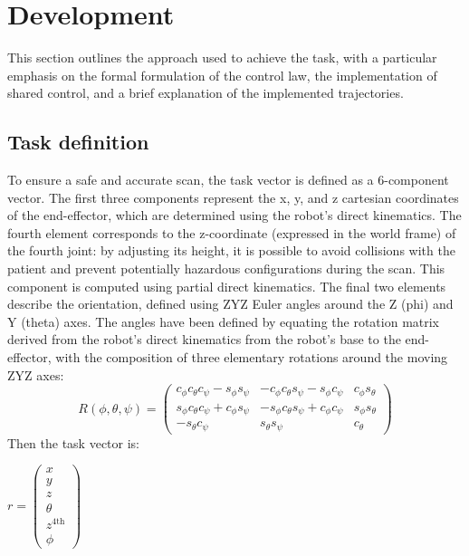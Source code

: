 \documentclass{article}
\begin{document}
\section{Development}
This section outlines the approach used to achieve the task, with a particular emphasis on the formal formulation of the control law, the implementation of shared control, and a brief explanation of the implemented trajectories.

\subsection{Task definition}
To ensure a safe and accurate scan, the task vector is defined as a 6-component vector. The first three components represent the x, y, and z cartesian coordinates of the end-effector, which are determined using the robot's direct kinematics. The fourth element corresponds to the z-coordinate (expressed in the world frame) of the fourth joint: by adjusting its height, it is possible to avoid collisions with the patient and prevent potentially hazardous configurations during the scan. This component is computed using partial direct kinematics. The final two elements describe the orientation, defined using ZYZ Euler angles around the Z (phi) and Y (theta) axes. 
The angles have been defined by equating the rotation matrix derived from the robot's direct kinematics from the robot’s base to the end-effector, with the composition of three elementary rotations around the moving ZYZ axes:
$$
R(\phi,\theta,\psi)=\begin{pmatrix}
c_{\phi}c_{\theta}c_{\psi}-s_{\phi}s_{\psi} & -c_{\phi}c_{\theta}s_{\psi}-s_{\phi}c_{\psi} & c_{\phi}s_{\theta}\\
s_{\phi}c_{\theta}c_{\psi}+c_{\phi}s_{\psi} & -s_{\phi}c_{\theta}s_{\psi}+c_{\phi}c_{\psi} & s_{\phi}s_{\theta}\\
-s_{\theta}c_{\psi} & s_{\theta}s_{\psi} & c_{\theta}
\end{pmatrix}
$$
Then the task vector is:
\newline
\noindent
\begin{minipage}{0.4\textwidth}
\hspace{1cm}
   $
    r=\begin{pmatrix}
    x\\
    y\\
    z\\
    \theta\\
    z^{\text{4th}}\\
    \phi
    \end{pmatrix}
    $
\end{minipage}%
\end{document}
